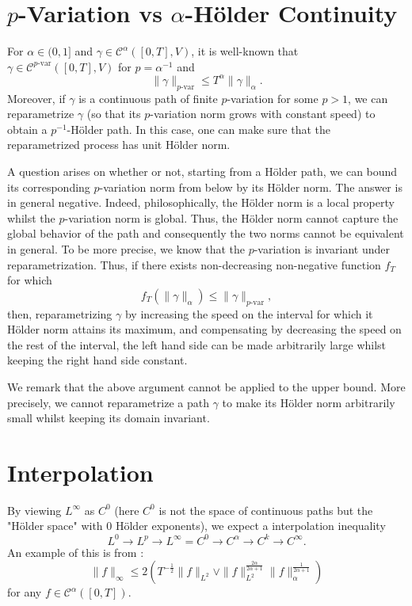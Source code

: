 \documentclass[]{article}
\theoremstyle{definition}
\theoremstyle{definition}
\def\pvar{p\mathrm{\text{-}var}}
\begin{document}
\title{}
\author{}
\maketitle

\section*{\(p\)-Variation vs \(\alpha\)-H\"older Continuity}

For \(\alpha \in (0, 1]\) and \(\gamma \in \mathcal{C}^\alpha([0, T], V)\), it is well-known that 
\(\gamma \in \mathcal{C}^{\pvar}([0, T], V)\) for \(p = \alpha^{-1}\) and 
\[\|\gamma\|_{\pvar} \le T^\alpha \|\gamma\|_\alpha.\]
Moreover, if \(\gamma\) is a continuous path of finite \(p\)-variation for some \(p > 1\), we 
can reparametrize \(\gamma\) (so that its \(p\)-variation norm grows with constant speed) to 
obtain a \(p^{-1}\)-H\"older path. In this case, one can make sure that the reparametrized process 
has unit H\"older norm. 

A question arises on whether or not, starting from a H\"older path, we can bound its corresponding 
\(p\)-variation norm from below by its H\"older norm. The answer is in general negative. Indeed, 
philosophically, the H\"older norm is a local property whilst the \(p\)-variation norm is global. 
Thus, the H\"older norm cannot capture the global behavior of the path and consequently the two 
norms cannot be equivalent in general. To be more precise, we know that the \(p\)-variation is 
invariant under reparametrization. Thus, if there exists non-decreasing non-negative function \(f_T\) for which 
\[f_T(\|\gamma\|_{\alpha}) \le \|\gamma\|_{\pvar},\]
then, reparametrizing \(\gamma\) by increasing the speed on the interval for which it H\"older norm 
attains its maximum, and compensating by decreasing the speed on the rest of the interval, the 
left hand side can be made arbitrarily large whilst keeping the right hand side constant. 

We remark that the above argument cannot be applied to the upper bound. More precisely, we cannot 
reparametrize a path \(\gamma\) to make its H\"older norm arbitrarily small whilst keeping its 
domain invariant. 

\section*{Interpolation}

By viewing \(L^\infty\) as \(C^0\) (here \(C^0\) is not the space of continuous paths but the 
"H\"older space" with 0 H\"older exponents), we expect a interpolation inequality 
\[L^0 \to L^p \to L^\infty = C^0 \to C^\alpha \to C^k \to C^\infty.\]
An example of this is from \cite[Lemma A.3]{Hairer:10}:
\[\|f\|_\infty \le 2 \left(T^{-\frac{1}{2}} \|f\|_{L^2} \vee 
  \|f\|_{L^2}^{\frac{2\alpha}{2\alpha + 1}} \|f\|_{\alpha}^{\frac{1}{2\alpha + 1}}\right)\]
for any \(f \in \mathcal{C}^\alpha([0, T])\).
\end{document}
